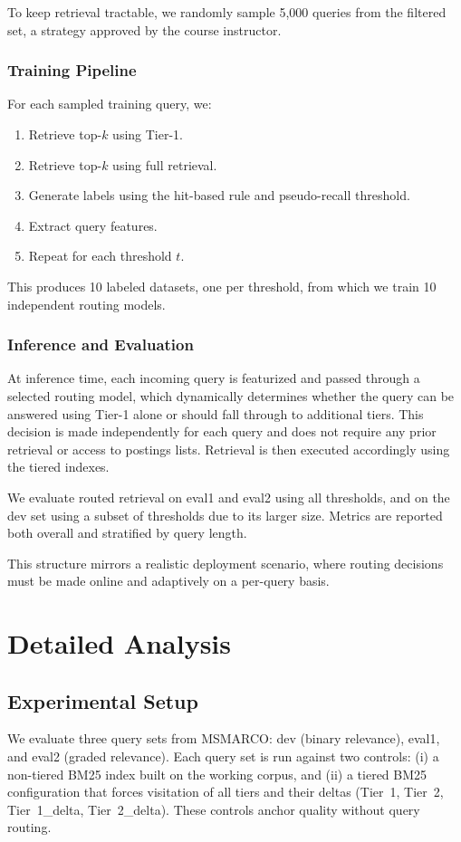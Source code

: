 \documentclass[11pt]{article}
\begin{document}
To keep retrieval tractable, we randomly sample 5,000 queries from the filtered set, a strategy approved by the course instructor.

\subsubsection{Training Pipeline}

For each sampled training query, we:
\begin{enumerate}
    \item Retrieve top-$k$ using Tier-1.
    \item Retrieve top-$k$ using full retrieval.
    \item Generate labels using the hit-based rule and pseudo-recall threshold.
    \item Extract query features.
    \item Repeat for each threshold $t$.
\end{enumerate}

\noindent This produces 10 labeled datasets, one per threshold, from which we train 10 independent routing models.

\subsubsection{Inference and Evaluation}

At inference time, each incoming query is featurized and passed through a selected routing model, which dynamically determines whether the query can be answered using Tier-1 alone or should fall through to additional tiers. This decision is made independently for each query and does not require any prior retrieval or access to postings lists. Retrieval is then executed accordingly using the tiered indexes.

We evaluate routed retrieval on eval1 and eval2 using all thresholds, and on the dev set using a subset of thresholds due to its larger size. Metrics are reported both overall and stratified by query length.

This structure mirrors a realistic deployment scenario, where routing decisions must be made online and adaptively on a per-query basis.


\section{Detailed Analysis}
\subsection{Experimental Setup}
We evaluate three query sets from MSMARCO: dev (binary relevance), eval1, and eval2 (graded relevance). Each query set is run against two controls: (i) a non-tiered BM25 index built on the working corpus, and (ii) a tiered BM25 configuration that forces visitation of all tiers and their deltas (Tier~1, Tier~2, Tier~1\_delta, Tier~2\_delta). These controls anchor quality without query routing.
\end{document}
